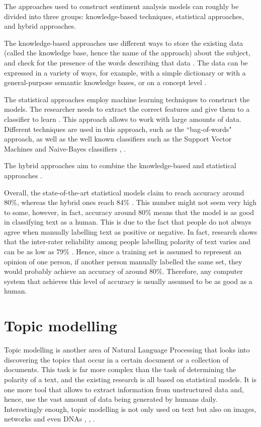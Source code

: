 The approaches used to construct sentiment analysis models can roughly be divided into three groups: knowledge-based techniques, statistical approaches, and hybrid approaches. 

The knowledge-based approaches use different ways to store the existing data (called the knowledge base, hence the name of the approach) about the subject, and check for the presence of the words describing that data \cite{chaumartin2007upar7}. The data can be expressed in a variety of ways, for example, with a simple dictionary or with a general-purpose semantic knowledge bases, or on a concept level \cite{cambria2013knowledge}. 

The statistical approaches employ machine learning techniques to construct the models. The researcher needs to extract the correct features and give them to a classifier to learn \cite{cambria2013statistical}. This approach allows to work with large amounts of data. Different techniques are used in this approach, such as the ``bag-of-words" approach, as well as the well known classifiers such as the Support Vector Machines and Naive-Bayes classifiers \cite{mullen2004sentiment}, \cite{tan2009adapting}.

The hybrid approaches aim to combine the knowledge-based and statistical approaches \cite{ghiassi2013twitter}. 

Overall, the state-of-the-art statistical models claim to reach accuracy around 80\%, whereas the hybrid ones reach 84\% \cite{thakkar2015approaches}. This number might not seem very high to some, however, in fact, accuracy around 80\% means that the model is as good in classifying text as a human. This is due to the fact that people do not always agree when manually labelling text as positive or negative. In fact, research shows that the inter-rater reliability among people labelling polarity of text varies and can be as low as 79\% \cite{bloom2007extracting}. Hence, since a training set is assumed to represent an opinion of one person, if another person manually labelled the same set, they would probably achieve an accuracy of around 80\%. Therefore, any computer system that achieves this level of accuracy is usually assumed to be as good as a human.

\section{Topic modelling}
\label{sec:topic_modelling}

Topic modelling is another area of Natural Language Processing that looks into discovering the topics that occur in a certain document or a collection of documents. This task is far more complex than the task of determining the polarity of a text, and the existing research is all based on statistical models. It is one more tool that allows to extract information from unstructured data and, hence, use the vast amount of data being generated by humans daily. Interestingly enough, topic modelling is not only used on text but also on images, networks and even DNAs \cite{liu2007unsupervised}, \cite{chang2009relational}, \cite{lau2013collocations}. 

